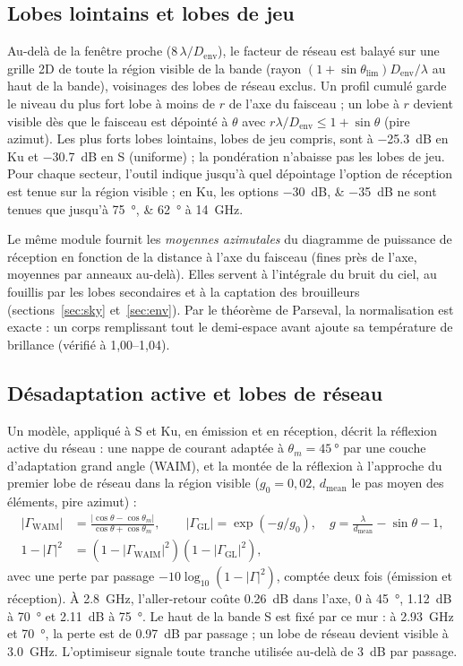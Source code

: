 \documentclass[11pt,a4paper]{article}
\newcommand{\Denv}{D_{\mathrm{env}}}
\begin{document}
\subsection{Lobes lointains et lobes de jeu}
Au-delà de la fenêtre proche ($8\,\lambda/\Denv$), le facteur de réseau est balayé sur une grille 2D de toute la région
visible de la bande (rayon $(1+\sin\theta_{\lim})\Denv/\lambda$ au haut de la bande), voisinages des lobes de réseau
exclus. Un profil cumulé garde le niveau du plus fort lobe à moins de $r$ de l'axe du faisceau ; un lobe à $r$ devient
visible dès que le faisceau est dépointé à $\theta$ avec $r\lambda/\Denv \le 1+\sin\theta$ (pire azimut). Les plus
forts lobes lointains, lobes de jeu compris, sont à \SI{-25.3}{dB} en Ku et \SI{-30.7}{dB} en S (uniforme) ; la
pondération n'abaisse pas les lobes de jeu. Pour chaque secteur, l'outil indique jusqu'à quel dépointage l'option de
réception est tenue sur la région visible ; en Ku, les options \SIlist{-30;-35}{dB} ne sont tenues que jusqu'à
\SIlist{75;62}{\degree} à \SI{14}{GHz}.

Le même module fournit les \emph{moyennes azimutales} du diagramme de puissance de réception en fonction de la
distance à l'axe du faisceau (fines près de l'axe, moyennes par anneaux au-delà). Elles servent à l'intégrale du bruit
du ciel, au fouillis par les lobes secondaires et à la captation des brouilleurs (sections~\ref{sec:sky}
et~\ref{sec:env}). Par le théorème de Parseval, la normalisation est exacte : un corps remplissant tout le demi-espace
avant ajoute sa température de brillance (vérifié à 1,00--1,04).

\subsection{Désadaptation active et lobes de réseau}\label{sec:mismatch}
Un modèle, appliqué à S et Ku, en émission et en réception, décrit la réflexion active du réseau : une nappe de
courant adaptée à $\theta_m = \SI{45}{\degree}$ par une couche d'adaptation grand angle (WAIM), et la montée de la
réflexion à l'approche du premier lobe de réseau dans la région visible ($g_0 = 0,02$, $d_{\mathrm{mean}}$ le pas moyen
des éléments, pire azimut) :
\begin{align*}
  |\Gamma_{\mathrm{WAIM}}| &= \frac{|\cos\theta - \cos\theta_m|}{\cos\theta + \cos\theta_m},\qquad
  |\Gamma_{\mathrm{GL}}| = \exp(-g/g_0),\quad g = \frac{\lambda}{d_{\mathrm{mean}}} - \sin\theta - 1,\\
  1 - |\Gamma|^2 &= (1 - |\Gamma_{\mathrm{WAIM}}|^2)(1 - |\Gamma_{\mathrm{GL}}|^2),
\end{align*}
avec une perte par passage $-10\log_{10}(1-|\Gamma|^2)$, comptée deux fois (émission et réception). À \SI{2.8}{GHz},
l'aller-retour coûte \SI{0.26}{dB} dans l'axe, 0 à \SI{45}{\degree}, \SI{1.12}{dB} à \SI{70}{\degree} et
\SI{2.11}{dB} à \SI{75}{\degree}. Le haut de la bande S est fixé par ce mur : à \SI{2.93}{GHz} et \SI{70}{\degree}, la
perte est de \SI{0.97}{dB} par passage ; un lobe de réseau devient visible à \SI{3.0}{GHz}. L'optimiseur signale toute
tranche utilisée au-delà de \SI{3}{dB} par passage.
\end{document}
